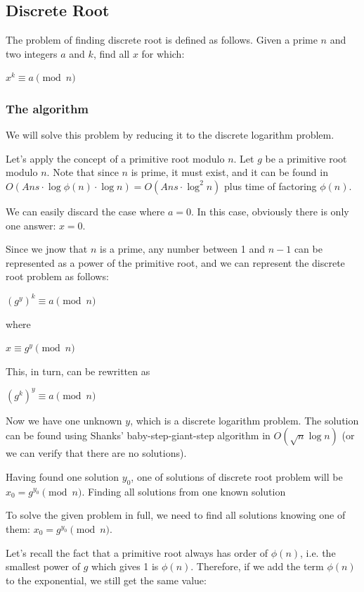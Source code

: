 \documentclass[8pt, a4paper, oneside, twocolumn]{extarticle}
\begin{document}
\subsection{Discrete Root}

The problem of finding discrete root is defined as follows. Given a prime $n$ and two integers $a$ and $k$, find all $x$ for which:

$x^k \equiv a \pmod n$
\subsubsection{The algorithm}

We will solve this problem by reducing it to the discrete logarithm problem.

Let's apply the concept of a primitive root modulo $n$. Let $g$ be a primitive root modulo $n$. Note that since $n$ is prime, it must exist, and it can be found in $O(Ans \cdot \log \phi (n) \cdot \log n) = O(Ans \cdot \log^2 n)$ plus time of factoring $\phi (n)$.

We can easily discard the case where $a = 0$. In this case, obviously there is only one answer: $x = 0$.

Since we jnow that $n$ is a prime, any number between 1 and $n-1$ can be represented as a power of the primitive root, and we can represent the discrete root problem as follows:

$(g^y)^k \equiv a \pmod n$

where

$x \equiv g^y \pmod n$

This, in turn, can be rewritten as

$(g^k)^y \equiv a \pmod n$

Now we have one unknown $y$, which is a discrete logarithm problem. The solution can be found using Shanks' baby-step-giant-step algorithm in $O(\sqrt {n} \log n)$ (or we can verify that there are no solutions).

Having found one solution $y_0$, one of solutions of discrete root problem will be $x_0 = g^{y_0} \pmod n$.
Finding all solutions from one known solution

To solve the given problem in full, we need to find all solutions knowing one of them: $x_0 = g^{y_0} \pmod n$.

Let's recall the fact that a primitive root always has order of $\phi (n)$, i.e. the smallest power of $g$ which gives 1 is $\phi (n)$. Therefore, if we add the term $\phi (n)$ to the exponential, we still get the same value:
\end{document}

